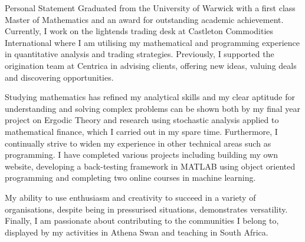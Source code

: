 \documentclass{resume} %
\begin{document}
\begin{rSection}{Personal Statement}	
Graduated from the University of Warwick with a first class Master of Mathematics and an award for outstanding academic achievement. Currently, I work on the lightends trading desk at Castleton Commodities International where I am utilising my mathematical and programming experience in quantitative analysis and trading strategies. Previously, I supported the origination team at Centrica in advising clients, offering new ideas, valuing deals and discovering opportunities.
\item Studying mathematics has refined my analytical skills and my clear aptitude for understanding and solving complex problems can be shown both by my final year project on Ergodic Theory and research using stochastic analysis applied to mathematical finance, which I carried out in my spare time. Furthermore, I continually strive to widen my experience in other technical areas such as programming. I have completed various projects including building my own website, developing a back-testing framework in MATLAB using object oriented programming and completing two online courses in machine learning.
\item My ability to use enthusiasm and creativity to succeed in a variety of organisations, despite being in pressurised situations, demonstrates versatility. Finally, I am passionate about contributing to the communities I belong to, displayed by my activities in Athena Swan and teaching in South Africa.
\end{rSection}
\end{document}
